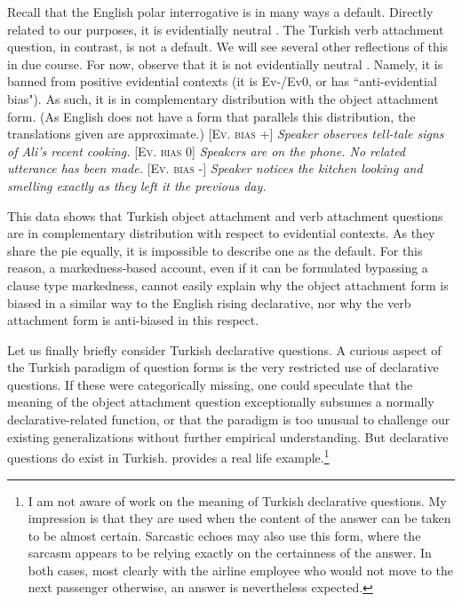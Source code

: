 \documentclass[output=paper,colorlinks,citecolor=brown]{langscibook}
\begin{document}
Recall that the English polar interrogative is in many ways a default. Directly related to our purposes, it is evidentially neutral . The Turkish verb attachment question, in contrast, is not a default. We will see several other reflections of this in due course. For now, observe that it is not evidentially neutral . Namely, it is banned from positive evidential contexts  (it is Ev-/Ev0, or has ``anti-evidential bias").  As such, it is in complementary distribution with the object attachment form. (As English does not have a form that parallels this distribution, the translations given are approximate.)
 \ea \label{ex:11:13}
 \ea \textsc{[Ev. bias +]} \textit{Speaker observes tell-tale signs of Ali's recent cooking.}
 \label{ex:11:13a}
\ex \textsc{[Ev. bias 0]} \textit{Speakers are on the phone. No related utterance has been made.}
\label{ex:11:13b}
\ex \textsc{$[$Ev. bias -]} \textit{Speaker notices the kitchen looking and smelling exactly as they left it the previous day.}
\label{ex:11:13c}
\z
\z

This data shows that Turkish object attachment and verb attachment questions are in complementary distribution with respect to evidential contexts. As they share the pie equally, it is impossible to describe one as the default. For this reason, a markedness-based account, even if it can be formulated bypassing a clause type markedness, cannot easily explain why the object attachment form is biased in a similar way to the English rising declarative, nor why the verb attachment form is anti-biased in this respect.

Let us finally briefly consider Turkish declarative questions. A curious aspect of the Turkish paradigm of question forms is  the very restricted use of declarative questions. If these were categorically missing, one could speculate that the meaning of the object attachment question exceptionally subsumes a normally declarative-related function, or that the paradigm is too unusual to challenge our existing generalizations without further empirical understanding. But declarative questions do exist in Turkish.  provides a real life example.\footnote{I am not aware of work on the meaning of Turkish declarative questions. My impression is that they are used when the content of the answer can be taken to be almost certain. Sarcastic echoes may also use this form, where the sarcasm appears to be relying exactly on the certainness of the answer. In both cases, most clearly with the airline employee who would not move to the next passenger otherwise, an answer is nevertheless expected.}
\end{document}
